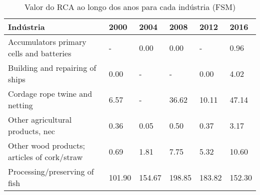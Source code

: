 \begin{table}
\centering
\caption{Valor do RCA ao longo dos anos para cada indústria (FSM)}
\label{tab:ex3-tempo-FSM}
\begin{tabular}{p{6cm}p{1.5cm}p{1.5cm}p{1.5cm}p{1.5cm}p{1.5cm}}
\toprule
                                  Indústria &   2000 &   2004 &   2008 &   2012 &   2016 \\
\midrule
   Accumulators primary cells and batteries &      - &   0.00 &   0.00 &      - &   0.96 \\
            Building and repairing of ships &   0.00 &      - &      - &   0.00 &   4.02 \\
             Cordage rope twine and netting &   6.57 &      - &  36.62 &  10.11 &  47.14 \\
           Other agricultural products, nec &   0.36 &   0.05 &   0.50 &   0.37 &   3.17 \\
Other wood products; articles of cork/straw &   0.69 &   1.81 &   7.75 &   5.32 &  10.60 \\
              Processing/preserving of fish & 101.90 & 154.67 & 198.85 & 183.82 & 152.30 \\
\bottomrule
\end{tabular}
\end{table}
